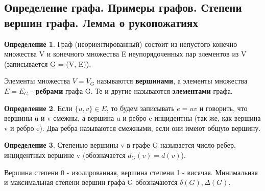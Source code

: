 \documentclass[a4paper]{article}
\theoremstyle{definition}
\newtheorem*{definition}{Определение}
\theoremstyle{remark}
\begin{document}
\begin{multicols*}{2}
    \tableofcontents
    \setcounter{page}{1}
    \section{Определение графа. Примеры графов. Степени вершин графа. Лемма о рукопожатиях}
    \begin{definition}
        Граф (неориентированный) состоит из непустого конечно множества V и конечного множества
        E неупорядоченных пар элементов из V (записывается G =  (V, E)).
    \end{definition}
    Элементы множества $V = V_G$ называются \textbf{вершинами}, а элементы множества $E = E_G$ - \textbf{ребрами} графа G.
    Те и другие называются \textbf{элементами} графа.
    \begin{definition}
        Если $\{u, v\}\in E$, то будем записывать $e = uv$ и говорить, что 
        вершины u и v смежны, а вершина u и ребро e инцидентны (так же, как вершина
        v и ребро e). Два ребра называются смежными, если они имеют общую вершину.
    \end{definition}
    \begin{definition}
        Степенью вершины v в графе G называется число ребер, инцидентных вершине v (обозначается $d_G(v) = d(v)$).
    \end{definition}
    Вершина степени 0 - изолированная, вершина степени 1 - висячая.
    Минимальная и максимальная степени вершин графа G обозначаются $\delta(G), \Delta(G)$.


\end{multicols*}
\end{document}
